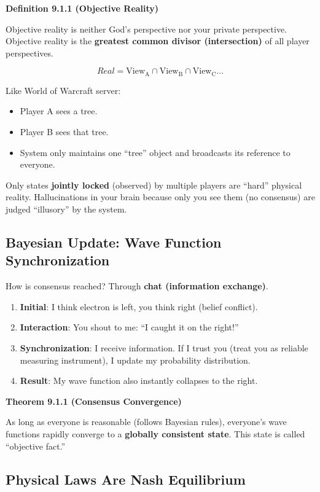 \textbf{Definition 9.1.1 (Objective Reality)}

Objective reality is neither God's perspective nor your private perspective.
Objective reality is the \textbf{greatest common divisor (intersection)} of all player perspectives.

\[
Real = \text{View}_{\text{A}} \cap \text{View}_{\text{B}} \cap \text{View}_{\text{C}} \dots
\]

Like World of Warcraft server:
\begin{itemize}
\item Player A sees a tree.
\item Player B sees that tree.
\item System only maintains one ``tree'' object and broadcasts its reference to everyone.
\end{itemize}

Only states \textbf{jointly locked} (observed) by multiple players are ``hard'' physical reality. Hallucinations in your brain because only you see them (no consensus) are judged ``illusory'' by the system.

\subsection{Bayesian Update: Wave Function Synchronization}

How is consensus reached? Through \textbf{chat (information exchange)}.

\begin{enumerate}
\item \textbf{Initial}: I think electron is left, you think right (belief conflict).
\item \textbf{Interaction}: You shout to me: ``I caught it on the right!''
\item \textbf{Synchronization}: I receive information. If I trust you (treat you as reliable measuring instrument), I update my probability distribution.
\item \textbf{Result}: My wave function also instantly collapses to the right.
\end{enumerate}

\textbf{Theorem 9.1.1 (Consensus Convergence)}

As long as everyone is reasonable (follows Bayesian rules), everyone's wave functions rapidly converge to a \textbf{globally consistent state}. This state is called ``objective fact.''

\subsection{Physical Laws Are Nash Equilibrium}


